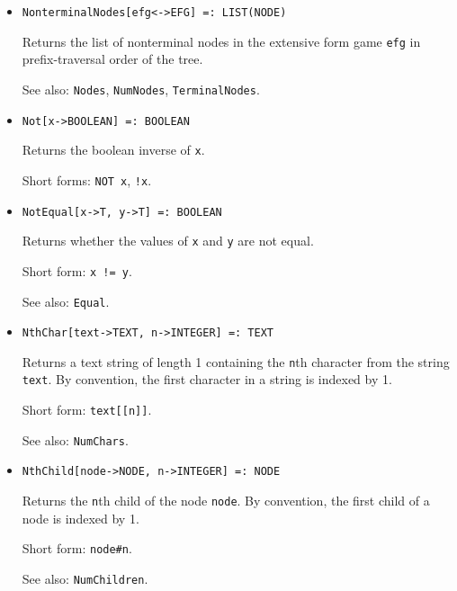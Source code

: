 \begin{itemize}
\item
\protect \large \begin{verbatim} 
NonterminalNodes[efg<->EFG] =: LIST(NODE)
\end{verbatim}\normalsize

\bd
Returns the list of nonterminal nodes in the extensive form
game \verb+efg+ in prefix-traversal order of the tree.
\item
[See also:] {\tt Nodes}, {\tt NumNodes}, {\tt TerminalNodes}.
\ed

\item
\protect \large \begin{verbatim}
Not[x->BOOLEAN] =: BOOLEAN
\end{verbatim}\normalsize

\bd
Returns the boolean inverse of \verb+x+.
\item
[Short forms:] \verb+NOT x+, \verb+!x+.
\ed

\item
\protect \large \begin{verbatim}
NotEqual[x->T, y->T] =: BOOLEAN
\end{verbatim}\normalsize

\bd
Returns whether the values of \verb+x+ and \verb+y+ are
not equal.
\item
[Short form:] \verb+x != y+.
\item
[See also:] {\tt Equal}.
\ed

\item
\protect \large \begin{verbatim}
NthChar[text->TEXT, n->INTEGER] =: TEXT
\end{verbatim}\normalsize

\bd
Returns a text string of length 1 containing the \verb+n+th
character from the string \verb+text+.  By convention, the first character
in a string is indexed by 1.
\item
[Short form:] \verb+text[[n]]+.
\item
[See also:] {\tt NumChars}.
\ed

\item
\protect \large \begin{verbatim} 
NthChild[node->NODE, n->INTEGER] =: NODE
\end{verbatim}\normalsize

\bd
Returns the \verb+n+th child of the node \verb+node+.
By convention, the first child of a node is indexed by 1.
\item
[Short form:] \verb+node#n+.
\item
[See also:] {\tt NumChildren}.
\ed


\end{itemize}
